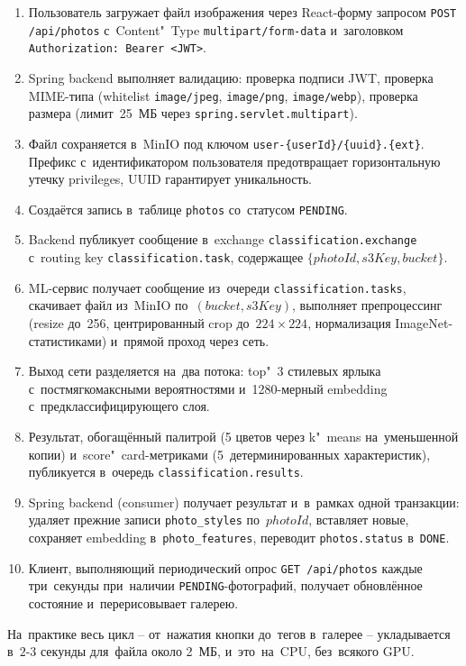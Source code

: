 \documentclass[a4paper,12pt]{diplom}
\begin{document}
\begin{enumerate}[label=\arabic{enumi})]
\item Пользователь загружает файл изображения через React-форму запросом \verb|POST /api/photos| с~Content"~Type \verb|multipart/form-data| и~заголовком \verb|Authorization: Bearer <JWT>|.
\item Spring backend выполняет валидацию: проверка подписи JWT, проверка MIME-типа (whitelist \verb|image/jpeg|, \verb|image/png|, \verb|image/webp|), проверка размера (лимит~25~МБ через \texttt{spring.servlet.multipart}).
\item Файл сохраняется в~MinIO под ключом \verb|user-{userId}/{uuid}.{ext}|. Префикс с~идентификатором пользователя предотвращает горизонтальную утечку privileges, UUID гарантирует уникальность.
\item Создаётся запись в~таблице \texttt{photos} со~статусом \texttt{PENDING}.
\item Backend публикует сообщение в~exchange \verb|classification.exchange| с~routing key \verb|classification.task|, содержащее $\{photoId, s3Key, bucket\}$.
\item ML-сервис получает сообщение из~очереди \verb|classification.tasks|, скачивает файл из~MinIO по~$(bucket, s3Key)$, выполняет препроцессинг (resize до~256, центрированный crop до~$224\times 224$, нормализация ImageNet-статистиками) и~прямой проход через сеть.
\item Выход сети разделяется на~два потока: top"~3 стилевых ярлыка с~постмягкомаксными вероятностями и~1280-мерный embedding с~предклассифицирующего слоя.
\item Результат, обогащённый палитрой (5 цветов через k"~means на~уменьшенной копии) и~score"~card-метриками (5~детерминированных характеристик), публикуется в~очередь \verb|classification.results|.
\item Spring backend (consumer) получает результат и~в~рамках одной транзакции: удаляет прежние записи \texttt{photo\_styles} по~$photoId$, вставляет новые, сохраняет embedding в~\texttt{photo\_features}, переводит \verb|photos.status| в~\texttt{DONE}.
\item Клиент, выполняющий периодический опрос \verb|GET /api/photos| каждые три~секунды при~наличии \texttt{PENDING}-фотографий, получает обновлённое состояние и~перерисовывает галерею.
\end{enumerate}

На~практике весь цикл -- от~нажатия кнопки до~тегов в~галерее -- укладывается в~$2$-$3$ секунды для~файла около 2~МБ, и~это~на~CPU, без~всякого GPU.
\end{document}
